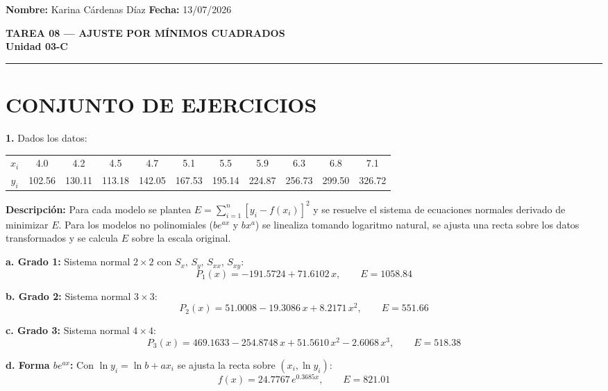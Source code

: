 \documentclass[12pt,a4paper]{article}
\begin{document}
\vspace*{0.5cm}

\textbf{Nombre:} Karina C\'ardenas D\'iaz \hfill \textbf{Fecha:} 13/07/2026

\vspace{0.3cm}
\begin{center}
  \textbf{\large TAREA 08 --- AJUSTE POR M\'INIMOS CUADRADOS}\\[2pt]
  \textbf{Unidad 03-C}
\end{center}
\vspace{0.2cm}

\hrule
\vspace{0.4cm}

\section*{CONJUNTO DE EJERCICIOS}

\textbf{1.} Dados los datos:

\begin{center}
\begin{tabular}{c|cccccccccc}
\toprule
$x_i$ & 4.0 & 4.2 & 4.5 & 4.7 & 5.1 & 5.5 & 5.9 & 6.3 & 6.8 & 7.1 \\
$y_i$ & 102.56 & 130.11 & 113.18 & 142.05 & 167.53 & 195.14 & 224.87 & 256.73 & 299.50 & 326.72 \\
\bottomrule
\end{tabular}
\end{center}

\textbf{Descripci\'on:} Para cada modelo se plantea $E=\sum_{i=1}^{n}[y_i-f(x_i)]^2$ y se resuelve el sistema de ecuaciones normales derivado de minimizar $E$. Para los modelos no polinomiales ($be^{ax}$ y $bx^a$) se linealiza tomando logaritmo natural, se ajusta una recta sobre los datos transformados y se calcula $E$ sobre la escala original.

\textbf{a. Grado 1:} Sistema normal $2\times 2$ con $S_x,\,S_y,\,S_{xx},\,S_{xy}$:
\[
\boxed{P_1(x) = -191.5724 + 71.6102\,x}, \qquad E = 1058.84
\]

\textbf{b. Grado 2:} Sistema normal $3\times 3$:
\[
\boxed{P_2(x) = 51.0008 - 19.3086\,x + 8.2171\,x^2}, \qquad E = 551.66
\]

\textbf{c. Grado 3:} Sistema normal $4\times 4$:
\[
\boxed{P_3(x) = 469.1633 - 254.8748\,x + 51.5610\,x^2 - 2.6068\,x^3}, \qquad E = 518.38
\]

\textbf{d. Forma $be^{ax}$:} Con $\ln y_i = \ln b + a x_i$ se ajusta la recta sobre $(x_i,\ln y_i)$:
\[
\boxed{f(x) = 24.7767\,e^{0.3685x}}, \qquad E = 821.01
\]
\end{document}
